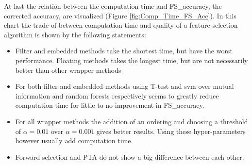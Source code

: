 \documentclass[10pt,a4paper]{article}
\begin{document}
	At last the relation between the computation time and FS\_accuracy, the corrected accuracy, are visualized (Figure \ref{fig:Comp_Time_FS_Acc}). In this chart the trade-of between computation time and quality of a feature selection algorithm is  shown by the following statements: 
	\begin{itemize}
		\item Filter and embedded methods take the shortest time, but have the worst performance. Floating methods takes the longest time, but are not necessarily better than other wrapper methods
		\item For both filter and embedded methods using T-test and svm over mutual information and random forests respectively seems to greatly reduce computation time for little to no improvement in FS\_accuracy.
		\item For all wrapper methods the addition of an ordering and choosing a threshold of $\alpha = 0.01$ over $\alpha = 0.001$ gives better results. Using these hyper-parameters however usually add computation time.
		\item Forward selection and PTA do not show a big difference between each other.
	\end{itemize}
	
\end{document}

